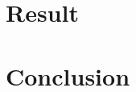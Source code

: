 \documentclass{article}
\begin{document}
\section{Result}
  
\section{Conclusion}

\begin{small}

 
\end{small}

\medskip
\end{document}
